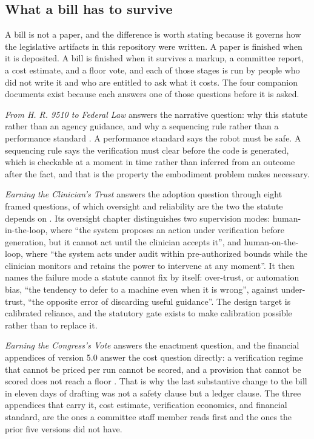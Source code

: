 \subsection{What a bill has to survive}

A bill is not a paper, and the difference is worth stating because it governs
how the legislative artifacts in this repository were written. A paper is
finished when it is deposited. A bill is finished when it survives a markup, a
committee report, a cost estimate, and a floor vote, and each of those stages is
run by people who did not write it and who are entitled to ask what it costs.
The four companion documents exist because each answers one of those questions
before it is asked.

\emph{From H. R. 9510 to Federal Law} answers the narrative question: why this
statute rather than an agency guidance, and why a sequencing rule rather than a
performance standard \cite{narrativecase2026}. A performance standard says the
robot must be safe. A sequencing rule says the verification must clear before
the code is generated, which is checkable at a moment in time rather than
inferred from an outcome after the fact, and that is the property the embodiment
problem makes necessary.

\emph{Earning the Clinician's Trust} answers the adoption question through eight
framed questions, of which oversight and reliability are the two the statute
depends on \cite{clintrust}. Its oversight chapter distinguishes two supervision
modes: human-in-the-loop, where ``the system proposes an action under
verification before generation, but it cannot act until the clinician accepts
it'', and human-on-the-loop, where ``the system acts under audit within
pre-authorized bounds while the clinician monitors and retains the power to
intervene at any moment''. It then names the failure mode a statute cannot fix
by itself: over-trust, or automation bias, ``the tendency to defer to a machine
even when it is wrong'', against under-trust, ``the opposite error of discarding
useful guidance''. The design target is calibrated reliance, and the statutory
gate exists to make calibration possible rather than to replace it.

\emph{Earning the Congress's Vote} answers the enactment question, and the
financial appendices of version 5.0 answer the cost question directly: a
verification regime that cannot be priced per run cannot be scored, and a
provision that cannot be scored does not reach a floor \cite{congressvote,
hr9510billv5}. That is why the last substantive change to the bill in eleven
days of drafting was not a safety clause but a ledger clause. The three
appendices that carry it, cost estimate, verification economics, and financial
standard, are the ones a committee staff member reads first and the ones the
prior five versions did not have.

